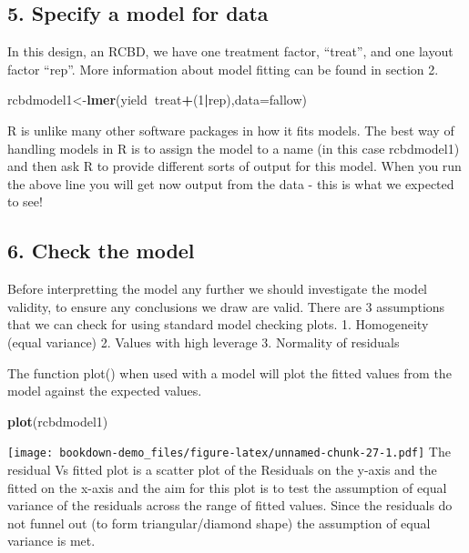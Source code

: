 \documentclass[]{book}
\newenvironment{Shaded}{\begin{snugshade}}{\end{snugshade}}
\newcommand{\KeywordTok}[1]{\textcolor[rgb]{0.13,0.29,0.53}{\textbf{#1}}}
\newcommand{\DataTypeTok}[1]{\textcolor[rgb]{0.13,0.29,0.53}{#1}}
\newcommand{\DecValTok}[1]{\textcolor[rgb]{0.00,0.00,0.81}{#1}}
\newcommand{\OperatorTok}[1]{\textcolor[rgb]{0.81,0.36,0.00}{\textbf{#1}}}
\newcommand{\NormalTok}[1]{#1}
\theoremstyle{definition}
\theoremstyle{definition}
\theoremstyle{definition}
\theoremstyle{remark}
\begin{document}
\subsection{5. Specify a model for data}\label{specify-a-model-for-data}

In this design, an RCBD, we have one treatment factor, ``treat'', and
one layout factor ``rep''. More information about model fitting can be
found in section 2.

\begin{Shaded}
\begin{Highlighting}[]
\NormalTok{rcbdmodel1<-}\KeywordTok{lmer}\NormalTok{(yield}\OperatorTok{~}\NormalTok{treat}\OperatorTok{+}\NormalTok{(}\DecValTok{1}\OperatorTok{|}\NormalTok{rep),}\DataTypeTok{data=}\NormalTok{fallow)}
\end{Highlighting}
\end{Shaded}

R is unlike many other software packages in how it fits models. The best
way of handling models in R is to assign the model to a name (in this
case rcbdmodel1) and then ask R to provide different sorts of output for
this model. When you run the above line you will get now output from the
data - this is what we expected to see!

\subsection{6. Check the model}\label{check-the-model}

Before interpretting the model any further we should investigate the
model validity, to ensure any conclusions we draw are valid. There are 3
assumptions that we can check for using standard model checking plots.
1. Homogeneity (equal variance) 2. Values with high leverage 3.
Normality of residuals

The function plot() when used with a model will plot the fitted values
from the model against the expected values.

\begin{Shaded}
\begin{Highlighting}[]
\KeywordTok{plot}\NormalTok{(rcbdmodel1)}
\end{Highlighting}
\end{Shaded}

\texttt{[image: bookdown-demo\_files/figure-latex/unnamed-chunk-27-1.pdf]}
The residual Vs fitted plot is a scatter plot of the Residuals on the
y-axis and the fitted on the x-axis and the aim for this plot is to test
the assumption of equal variance of the residuals across the range of
fitted values. Since the residuals do not funnel out (to form
triangular/diamond shape) the assumption of equal variance is met.
\end{document}
